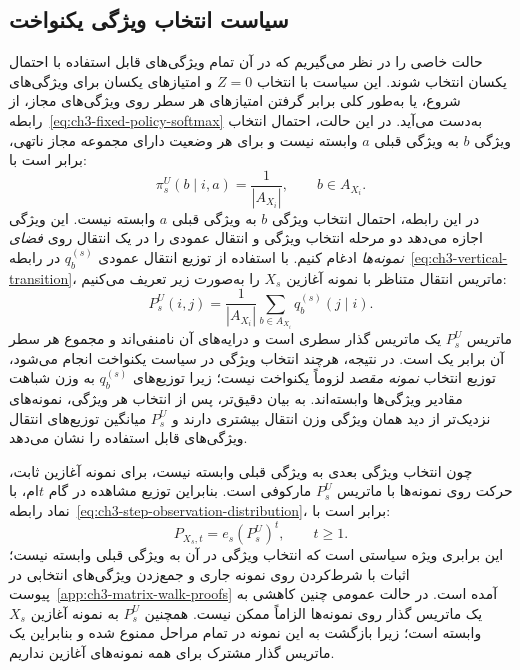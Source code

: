 \subsection{سیاست انتخاب ویژگی یکنواخت}
\label{subsec:ch3-uniform-policy}
حالت خاصی را در نظر می‌گیریم که در آن تمام ویژگی‌های قابل استفاده با احتمال یکسان انتخاب شوند. این سیاست با انتخاب $Z=0$ و امتیازهای یکسان برای ویژگی‌های شروع، یا به‌طور کلی برابر گرفتن امتیازهای هر سطر روی ویژگی‌های مجاز، از رابطه~\eqref{eq:ch3-fixed-policy-softmax} به‌دست می‌آید. در این حالت، احتمال انتخاب ویژگی $b$ به ویژگی قبلی $a$ وابسته نیست و برای هر وضعیت دارای مجموعه مجاز ناتهی، برابر است با:
\begin{equation}\label{eq:ch3-uniform-policy}
\pi_s^{U}(b\mid i,a)=\frac{1}{|A_{X_i}|},
\qquad b\in A_{X_i}.
\end{equation}
در این رابطه، احتمال انتخاب ویژگی $b$ به ویژگی قبلی $a$ وابسته نیست. این ویژگی اجازه می‌دهد دو مرحله انتخاب ویژگی و انتقال عمودی را در یک انتقال روی \emph{فضای نمونه‌ها} ادغام کنیم. با استفاده از توزیع انتقال عمودی $q_b^{(s)}$ در رابطه~\eqref{eq:ch3-vertical-transition}، ماتریس انتقال متناظر با نمونه آغازین $X_s$ را به‌صورت زیر تعریف می‌کنیم:
\begin{equation}\label{eq:ch3-uniform-T}
P_s^{U}(i,j)=\frac{1}{|A_{X_i}|}
\sum_{b\in A_{X_i}}q_b^{(s)}(j\mid i).
\end{equation}
ماتریس $P_s^{U}$ یک ماتریس گذار سطری است و درایه‌های آن نامنفی‌اند و مجموع هر سطر آن برابر یک است. در نتیجه، هرچند انتخاب ویژگی در سیاست یکنواخت انجام می‌شود، توزیع انتخاب \emph{نمونه مقصد} لزوماً یکنواخت نیست؛ زیرا توزیع‌های $q_b^{(s)}$ به وزن شباهت مقادیر ویژگی‌ها وابسته‌اند. به بیان دقیق‌تر، پس از انتخاب هر ویژگی، نمونه‌های نزدیک‌تر از دید همان ویژگی وزن انتقال بیشتری دارند و $P_s^{U}$ میانگین توزیع‌های انتقال ویژگی‌های قابل استفاده را نشان می‌دهد.

چون انتخاب ویژگی بعدی به ویژگی قبلی وابسته نیست، برای نمونه آغازین ثابت، حرکت روی نمونه‌ها با ماتریس $P_s^{U}$ مارکوفی است. بنابراین توزیع مشاهده در گام $t$ام، با نماد رابطه~\eqref{eq:ch3-step-observation-distribution}، برابر است با:
\begin{equation}\label{eq:ch3-uniform-step-distribution}
P_{X_s,t}=e_s(P_s^{U})^t,\qquad t\ge1.
\end{equation}
این برابری ویژه سیاستی است که انتخاب ویژگی در آن به ویژگی قبلی وابسته نیست؛ اثبات با شرط‌کردن روی نمونه جاری و جمع‌زدن ویژگی‌های انتخابی در پیوست~\ref{app:ch3-matrix-walk-proofs} آمده است. در حالت عمومی چنین کاهشی به یک ماتریس گذار روی نمونه‌ها الزاماً ممکن نیست. همچنین $P_s^{U}$ به نمونه آغازین $X_s$ وابسته است؛ زیرا بازگشت به این نمونه در تمام مراحل ممنوع شده و بنابراین یک ماتریس گذار مشترک برای همه نمونه‌های آغازین نداریم.

